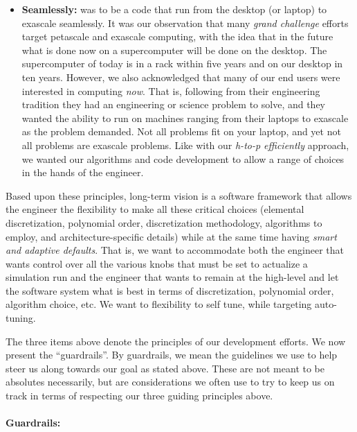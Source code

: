 \begin{itemize}
\item \textbf{Seamlessly:}  {\nek} was to be a code that run from the desktop (or laptop) to exascale seamlessly.  It was our
observation that many {\em grand challenge} efforts target petascale and exascale computing, with the idea that in the future
what is done now on a supercomputer will be done on the desktop.  The supercomputer of today is in a rack within five
years and on our desktop in ten years.  However, we also acknowledged that many of our end users were interested in computing
{\em now}.  That is, following from their engineering tradition they had an engineering or science problem to solve, and they wanted 
the ability to run on machines ranging from their laptops to exascale as the problem demanded.  Not all problems fit on your laptop, 
and yet not all problems are exascale problems.  Like with our {\em h-to-p efficiently} approach, we wanted our algorithms and code
development to allow a range of choices in the hands of the engineer.
\end{itemize}

Based upon these principles, long-term vision is a software framework that allows the engineer the flexibility to make all
these critical choices (elemental discretization, polynomial order, discretization methodology, algorithms to employ, and 
architecture-specific details) while at the same time having {\em smart and adaptive defaults}.  That is, we want to 
accommodate both the engineer that wants control over all the various knobs that must be set to actualize a simulation run
and the engineer that wants to remain at the high-level and let the software system what is best in terms of discretization,
polynomial order, algorithm choice, etc.  We want to flexibility to self tune, while targeting auto-tuning.

The three items above denote the principles of our development efforts.  We now present the ``guardrails''.  By guardrails, we mean
the guidelines we use to help steer us along towards our goal as stated above.  These are not meant to be absolutes necessarily,
but are considerations we often use to try to keep us on track in terms of respecting our three guiding principles above.

\paragraph{Guardrails:}

